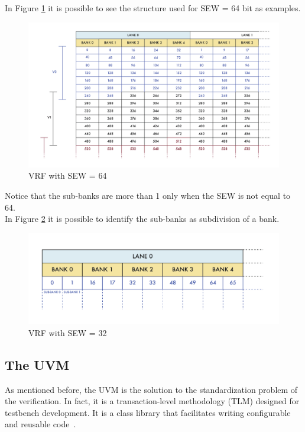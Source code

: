 In Figure \ref{vrf-64} it is possible to see the structure used for SEW = 64 bit as examples.
\begin{figure}[H]
    \centering
    \includegraphics[scale = 0.45]{Chapter_1/img/vrf-64.png}
    \caption{VRF with SEW = 64}
    \label{vrf-64}
\end{figure}

Notice that the sub-banks are more than 1 only when the SEW is not equal to 64. \\

In Figure \ref{vrf-32} it is possible to identify the sub-banks as subdivision of a bank.
\begin{figure}[H]
    \centering
    \includegraphics[scale = 0.7]{Chapter_1/img/vrf-32.png}
    \caption{VRF with SEW = 32}
    \label{vrf-32}
\end{figure}




\subsection{The UVM}
As mentioned before, the UVM is the solution to the standardization problem of the verification. In fact, it is a transaction-level methodology (TLM) designed for testbench development. It is a class library that facilitates writing configurable and reusable code~\cite{verification-book-2018}.

